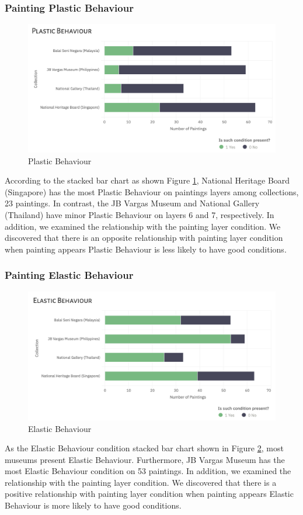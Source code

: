 \documentclass[11pt, oneside]{article}
\begin{document}
\subsubsection{Painting Plastic Behaviour}
\begin{figure}[H]
    \centering
    \includegraphics[scale=0.5]{images/Plastic_media_con.png}
    \caption{Plastic Behaviour}
    \label{Plastic_media_con}
\end{figure}
According to the stacked bar chart as shown Figure \ref{Plastic_media_con}, National Heritage Board (Singapore) has the most Plastic Behaviour on paintings layers among collections, 23 paintings. In contrast, the JB Vargas Museum and National Gallery (Thailand) have minor Plastic Behaviour on layers 6 and 7, respectively.
In addition, we examined the relationship with the painting layer condition. We discovered that there is an opposite relationship with painting layer condition when painting appears Plastic Behaviour is less likely to have good conditions.

\subsubsection{Painting Elastic Behaviour}
\begin{figure}[H]
    \centering
    \includegraphics[scale=0.5]{images/Elastic_media_con.png}
    \caption{Elastic Behaviour}
    \label{Elastic_media_con}
\end{figure}
As the Elastic Behaviour condition stacked bar chart shown in Figure \ref{Elastic_media_con}, most museums present Elastic Behaviour. Furthermore, JB Vargas Museum has the most Elastic Behaviour condition on 53 paintings.
In addition, we examined the relationship with the painting layer condition. We discovered that there is a positive relationship with painting layer condition when painting appears Elastic Behaviour is more likely to have good conditions.
\end{document}
